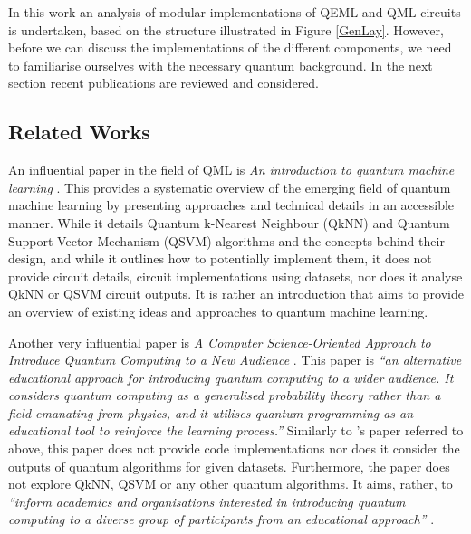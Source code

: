 In this work an analysis of modular implementations of QEML and QML circuits is undertaken, based on the structure illustrated in Figure \ref{GenLay}. However, before we can discuss the implementations of the different components, we need to familiarise ourselves with the necessary quantum background. In the next section recent publications are reviewed and considered.

\subsection{Related Works}

An influential paper in the field of QML is 
\emph{An introduction to quantum machine learning}
\citep{research1}. This provides a systematic overview of the emerging field of quantum machine learning by presenting approaches and technical details in an accessible manner. 
While it details Quantum k-Nearest Neighbour (QkNN) and Quantum Support Vector Mechanism (QSVM) algorithms and the concepts behind their design, and while it outlines how to potentially implement them, it does not provide circuit details, circuit implementations using datasets, nor does it analyse QkNN or QSVM circuit outputs. It is rather an introduction that aims to provide an overview of existing ideas and approaches to quantum machine learning. 

Another very influential paper is \emph{A Computer Science-Oriented Approach to Introduce Quantum Computing to a New Audience}
\citep{research2}. This paper is \emph{``an alternative educational approach for introducing quantum computing to a wider audience. It considers quantum computing as a generalised probability theory rather than a field emanating from physics, and it utilises quantum programming as an educational tool to reinforce the learning process.''}
Similarly to \citeauthor{research1}'s paper referred to above,
this paper does not provide code implementations nor does it consider the outputs of quantum algorithms for given datasets. Furthermore, the paper does not explore QkNN, QSVM or any other quantum algorithms. It aims, rather, to \emph{``inform academics and organisations interested in introducing quantum computing to a diverse group of participants from an educational approach''} \citep{research2}.

